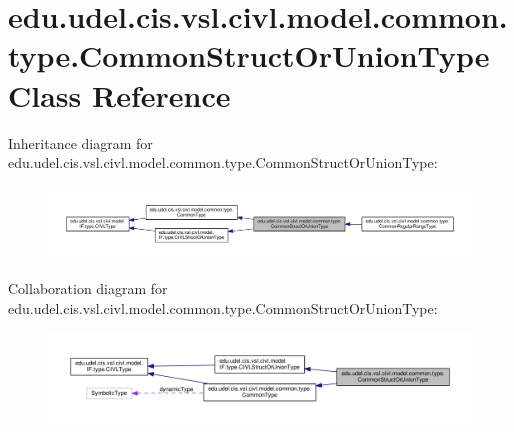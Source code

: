 \hypertarget{classedu_1_1udel_1_1cis_1_1vsl_1_1civl_1_1model_1_1common_1_1type_1_1CommonStructOrUnionType}{}\section{edu.\+udel.\+cis.\+vsl.\+civl.\+model.\+common.\+type.\+Common\+Struct\+Or\+Union\+Type Class Reference}
\label{classedu_1_1udel_1_1cis_1_1vsl_1_1civl_1_1model_1_1common_1_1type_1_1CommonStructOrUnionType}


Inheritance diagram for edu.\+udel.\+cis.\+vsl.\+civl.\+model.\+common.\+type.\+Common\+Struct\+Or\+Union\+Type\+:
\nopagebreak
\begin{figure}[H]
\begin{center}
\leavevmode
\includegraphics[width=350pt]{classedu_1_1udel_1_1cis_1_1vsl_1_1civl_1_1model_1_1common_1_1type_1_1CommonStructOrUnionType__inherit__graph}
\end{center}
\end{figure}


Collaboration diagram for edu.\+udel.\+cis.\+vsl.\+civl.\+model.\+common.\+type.\+Common\+Struct\+Or\+Union\+Type\+:
\nopagebreak
\begin{figure}[H]
\begin{center}
\leavevmode
\includegraphics[width=350pt]{classedu_1_1udel_1_1cis_1_1vsl_1_1civl_1_1model_1_1common_1_1type_1_1CommonStructOrUnionType__coll__graph}
\end{center}
\end{figure}
